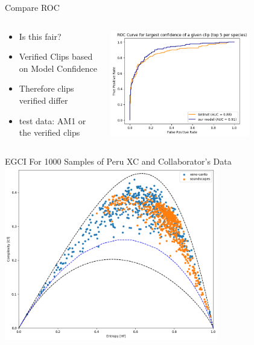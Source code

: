 \begin{frame}{Compare ROC}
    \begin{columns}
        \begin{column}{0.5\textwidth}
            \begin{itemize}
                \item Is this fair?
                \item Verified Clips based on Model Confidence
                \item Therefore clips verified differ
                \item test data: AM1 or the verified clips
            \end{itemize}
        \end{column}
        \begin{column}{0.5\textwidth}
            \includegraphics[height=0.7\textheight,width=0.7\textwidth,keepaspectratio]{./images/roc.png}
        \end{column}
    \end{columns}
\end{frame}

\begin{frame}{EGCI For 1000 Samples of Peru XC and Collaborator's Data}
    \centering
    \includegraphics[height=0.7\textheight,width=0.7\textwidth,keepaspectratio]{./images/EGCI.png}
\end{frame}

